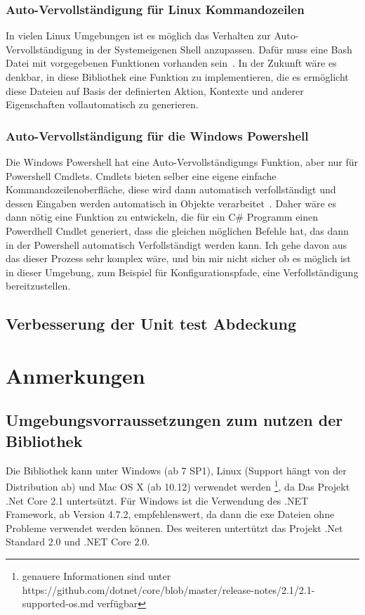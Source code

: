 \documentclass[a4paper,11pt,titlepage,ngerman]{article}
\begin{document}
\begin{sloppypar}
  \subsubsection{Auto-Vervollständigung für Linux Kommandozeilen}
  In vielen Linux Umgebungen ist es möglich das Verhalten zur Auto-Vervollständigung in der Systemeigenen Shell anzupassen.
  Dafür muss eine Bash Datei mit vorgegebenen Funktionen vorhanden sein~\cite{BashAutoComplete}.
  In der Zukunft wäre es denkbar, in diese Bibliothek eine Funktion zu implementieren, die es ermöglicht diese Dateien auf Basis der definierten Aktion,
  Kontexte und anderer Eigenschaften vollautomatisch zu generieren.
  \subsubsection{Auto-Vervollständigung für die Windows Powershell}
  Die Windows Powershell hat eine Auto-Vervollständigungs Funktion, aber nur für Powershell Cmdlets.
  Cmdlets bieten selber eine eigene einfache Kommandozeilenoberfläche, diese wird dann automatisch verfollständigt und dessen Eingaben werden automatisch in Objekte verarbeitet~\cite{CustomCmdlet}.
  Daher wäre es dann nötig eine Funktion zu entwickeln, die für ein C\# Programm einen Powerdhell Cmdlet generiert, dass die gleichen möglichen Befehle hat, 
  das dann in der Powershell automatisch Verfollständigt werden kann.
    Ich gehe davon aus das dieser Prozess sehr komplex wäre, und bin mir nicht sicher ob es möglich ist in dieser Umgebung, zum Beispiel für Konfigurationspfade, eine Verfollständigung bereitzustellen.
  \subsection{Verbesserung der Unit test Abdeckung}\label{subsec:MoreUnitTests}
  \section{Anmerkungen}\label{sec:AdditionalNotes}
  \subsection{Umgebungsvorraussetzungen zum nutzen der Bibliothek}\label{subsec:SystemRequirements}
   Die Bibliothek kann unter Windows (ab 7 SP1), Linux (Support hängt von der Distribution ab) und Mac OS X (ab 10.12) verwendet werden
  \footnote{genauere Informationen sind unter https://github.com/dotnet/core/blob/master/release-notes/2.1/2.1-supported-os.md verfügbar}, 
  da Das Projekt .Net Core 2.1 untertsützt.
  Für Windows ist die Verwendung des .NET Framework, ab Version 4.7.2, empfehlenswert, da dann die exe Dateien ohne Probleme verwendet werden können.
  Des weiteren untertützt das Projekt .Net Standard 2.0 und .NET Core 2.0.

\end{sloppypar}
\end{document}

